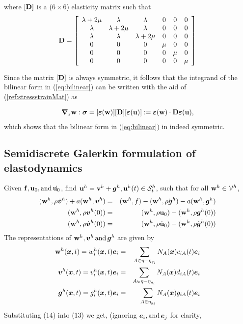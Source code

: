 where $[\mathbf{D}]$ is a ($6\times6$) elasticity matrix such that
\begin{equation}
  \mathbf{D}= \left[ \begin{array}{cccccc}
    \lambda + 2 \mu & \lambda & \lambda & 0 & 0 & 0\\
    \lambda & \lambda + 2 \mu & \lambda & 0 & 0 & 0\\
    \lambda & \lambda & \lambda + 2 \mu & 0 & 0 & 0\\
    0 & 0 & 0 & \mu & 0 & 0\\
    0 & 0 & 0 & 0 & \mu & 0\\
    0 & 0 & 0 & 0 & 0 & \mu
  \end{array} \right]
\end{equation}

Since the matrix $[\mathbf{D}]$ is always symmetric, it follows that the integrand of the bilinear form in (\ref{eq:bilinear}) can be written with the aid of (\ref{ref:stressstrainMat}) as

\[
{\boldsymbol{\nabla}}_s\mathbf{w}:{\boldsymbol{\sigma}} = [{\boldsymbol{\varepsilon}}(\mathbf{w})][\mathbf{D}][{\boldsymbol{\varepsilon}}(\mathbf{u})] := {\boldsymbol{\varepsilon}}(\mathbf{w})\cdot\mathbf{D}{\boldsymbol{\varepsilon}}(\mathbf{u}) ,
\]
which shows that the bilinear form in (\ref{eq:bilinear}) in indeed symmetric. 

\subsection{Semidiscrete Galerkin formulation of elastodynamics}

Given $\mathbf{f}, \mathbf{u}_0, \operatorname{and} \dot{\mathbf{u}_0}$, find $\mathbf{u}^h =\mathbf{v}^h
+\boldsymbol{g}^h,\mathbf{u}^h ( t ) \in \mathcal{S}_t^h$, such that for all
$\mathbf{w}^h \in \mathcal{V}^h$,
\begin{eqnarray}
  (\mathbf{w}^h, \rho \ddot{\boldsymbol{v}}^h ) + a
  (\mathbf{w}^h,\boldsymbol{v}^h ) & = & (\mathbf{w}^h, f ) 
- (\mathbf{w}^h, \rho \ddot{\boldsymbol{g}}^h ) - a (\mathbf{w}^h,\boldsymbol{g}^h ) \nonumber\\
  (\mathbf{w}^h, \rho \boldsymbol{v}^h ( 0 ) ) & = & (\mathbf{w}^h, \rho
  \mathbf{u}_0 ) - (\mathbf{w}^h, \rho \boldsymbol{g}^h ( 0 ) ) \nonumber\\
  (\mathbf{w}^h, \rho \dot{\boldsymbol{v}}^h ( 0 ) ) & = & (\mathbf{w}^h,
  \rho \dot{\mathbf{u}}_0 ) - (\mathbf{w}^h, \rho \dot{\boldsymbol{g}}^h ( 0
  ) ) 
\end{eqnarray}
The representations of $\mathbf{w}^h,\boldsymbol{v}^h \operatorname{and}
\boldsymbol{g}^h$ are given by
\begin{eqnarray}
  \mathbf{w}^h (\boldsymbol{x}, t ) = w_i^h (\boldsymbol{x}, t )\boldsymbol{e}_i &
  = & \sum_{A \in \eta - \eta_{q_i}} N_A (\boldsymbol{x}) c_{i A} ( t
  )\boldsymbol{e}_i \nonumber\\
  \boldsymbol{v}^h (\boldsymbol{x}, t ) = v_i^h (\boldsymbol{x}, t )\boldsymbol{e}_i &
  = & \sum_{A \in \eta - \eta_{g_i}} N_A (\boldsymbol{x}) d_{i A} ( t
  )\boldsymbol{e}_i \nonumber\\
  \boldsymbol{g}^h (\boldsymbol{x}, t ) = g_i^h (\boldsymbol{x}, t )\boldsymbol{e}_i &
  = & \sum_{A \in \eta_{g_i}} N_A (\boldsymbol{x}) g_{i A} ( t )\boldsymbol{e}_i 
\end{eqnarray}
Substituting (14) into (13) we get, (ignoring $\boldsymbol{e}_i, \operatorname{and}
\boldsymbol{e}_j$ for clarity,

